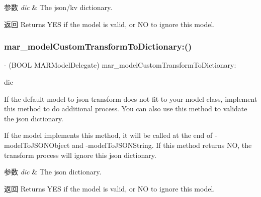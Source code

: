 \begin{DoxyParams}{参数}
{\em dic} & The json/kv dictionary.\\
\hline
\end{DoxyParams}
\begin{DoxyReturn}{返回}
Returns Y\+ES if the model is valid, or NO to ignore this model. 
\end{DoxyReturn}
\mbox{\label{protocol_m_a_r_model_delegate_01-p_a8fec3a1801566f0c11646a520912e1f4}} 
\subsubsection{\texorpdfstring{mar\+\_\+model\+Custom\+Transform\+To\+Dictionary\+:()}{mar\_modelCustomTransformToDictionary:()}}
{\footnotesize\ttfamily -\/ (B\+O\+OL M\+A\+R\+Model\+Delegate) mar\+\_\+model\+Custom\+Transform\+To\+Dictionary\+: \begin{DoxyParamCaption}\item[{(N\+S\+Mutable\+Dictionary $\ast$)}]{dic }\end{DoxyParamCaption}}

If the default model-\/to-\/json transform does not fit to your model class, implement this method to do additional process. You can also use this method to validate the json dictionary.

If the model implements this method, it will be called at the end of {\ttfamily -\/model\+To\+J\+S\+O\+N\+Object} and {\ttfamily -\/model\+To\+J\+S\+O\+N\+String}. If this method returns NO, the transform process will ignore this json dictionary.


\begin{DoxyParams}{参数}
{\em dic} & The json dictionary.\\
\hline
\end{DoxyParams}
\begin{DoxyReturn}{返回}
Returns Y\+ES if the model is valid, or NO to ignore this model. 
\end{DoxyReturn}
\mbox{\label{protocol_m_a_r_model_delegate_01-p_a65f104eb0009458f76a4edabae789f89}} 
